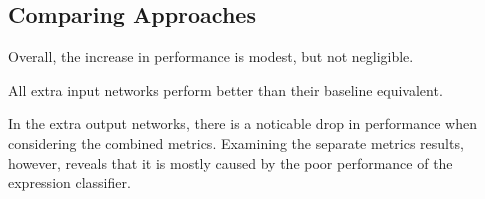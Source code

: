 \subsection{Comparing Approaches}



Overall, the increase in performance is modest, but not negligible.

All extra input networks perform better than their baseline equivalent.

In the extra output networks, there is a noticable drop in performance when considering the combined metrics. Examining the separate metrics results, however, reveals that it is mostly caused by the poor performance of the expression classifier. 

\cleardoublepage